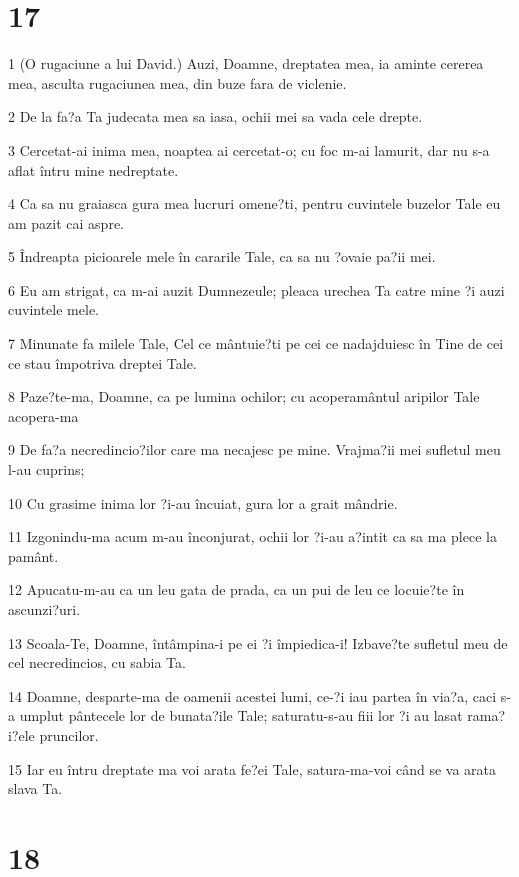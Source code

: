 \chapter{17}

\par 1 (O rugaciune a lui David.) Auzi, Doamne, dreptatea mea, ia aminte cererea mea, asculta rugaciunea mea, din buze fara de viclenie.
\par 2 De la fa?a Ta judecata mea sa iasa, ochii mei sa vada cele drepte.
\par 3 Cercetat-ai inima mea, noaptea ai cercetat-o; cu foc m-ai lamurit, dar nu s-a aflat întru mine nedreptate.
\par 4 Ca sa nu graiasca gura mea lucruri omene?ti, pentru cuvintele buzelor Tale eu am pazit cai aspre.
\par 5 Îndreapta picioarele mele în cararile Tale, ca sa nu ?ovaie pa?ii mei.
\par 6 Eu am strigat, ca m-ai auzit Dumnezeule; pleaca urechea Ta catre mine ?i auzi cuvintele mele.
\par 7 Minunate fa milele Tale, Cel ce mântuie?ti pe cei ce nadajduiesc în Tine de cei ce stau împotriva dreptei Tale.
\par 8 Paze?te-ma, Doamne, ca pe lumina ochilor; cu acoperamântul aripilor Tale acopera-ma
\par 9 De fa?a necredincio?ilor care ma necajesc pe mine. Vrajma?ii mei sufletul meu l-au cuprins;
\par 10 Cu grasime inima lor ?i-au încuiat, gura lor a grait mândrie.
\par 11 Izgonindu-ma acum m-au înconjurat, ochii lor ?i-au a?intit ca sa ma plece la pamânt.
\par 12 Apucatu-m-au ca un leu gata de prada, ca un pui de leu ce locuie?te în ascunzi?uri.
\par 13 Scoala-Te, Doamne, întâmpina-i pe ei ?i împiedica-i! Izbave?te sufletul meu de cel necredincios, cu sabia Ta.
\par 14 Doamne, desparte-ma de oamenii acestei lumi, ce-?i iau partea în via?a, caci s-a umplut pântecele lor de bunata?ile Tale; saturatu-s-au fiii lor ?i au lasat rama?i?ele pruncilor.
\par 15 Iar eu întru dreptate ma voi arata fe?ei Tale, satura-ma-voi când se va arata slava Ta.

\chapter{18}

